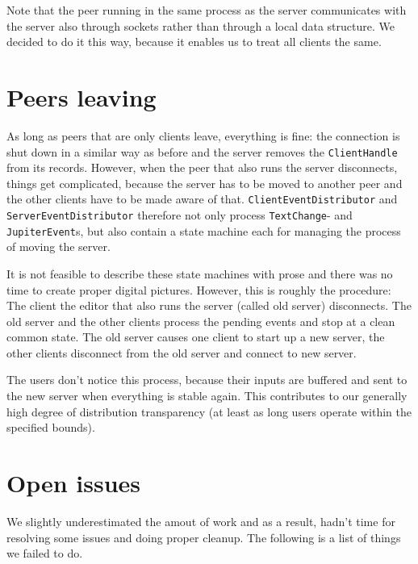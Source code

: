 \documentclass[a4paper,final,12pt,oneside,article,table]{memoir}
\newcommand{\mil}[1]{\texttt{#1}}
\begin{document}
Note that the peer running in the same process as the server
communicates with the server also through sockets rather than through a
local data structure. We decided to do it this way, because it enables
us to treat all clients the same.

\chapter{Peers leaving}

As long as peers that are only clients leave, everything is fine: the
connection is shut down in a similar way as before and the server
removes the \mil{ClientHandle} from its records. However, when the peer
that also runs the server disconnects, things get complicated, because
the server has to be moved to another peer and the other clients have to
be made aware of that. \mil{ClientEventDistributor} and
\mil{ServerEventDistributor} therefore not only process
\mil{TextChange}- and \mil{JupiterEvent}s, but also contain a state
machine each for managing the process of moving the server.

It is not feasible to describe these state machines with prose and there
was no time to create proper digital pictures. However, this is roughly
the procedure: The client the editor that also runs the server (called
old server) disconnects. The old server and the other clients process
the pending events and stop at a clean common state. The old server
causes one client to start up a new server, the other clients disconnect
from the old server and connect to new server.

The users don't notice this process, because their inputs are buffered
and sent to the new server when everything is stable again. This
contributes to our generally high degree of distribution transparency
(at least as long users operate within the specified bounds).

\chapter{Open issues}
\label{sec:notime}

We slightly underestimated the amout of work and as a result, hadn't
time for resolving some issues and doing proper cleanup. The following
is a list of things we failed to do.
\end{document}
